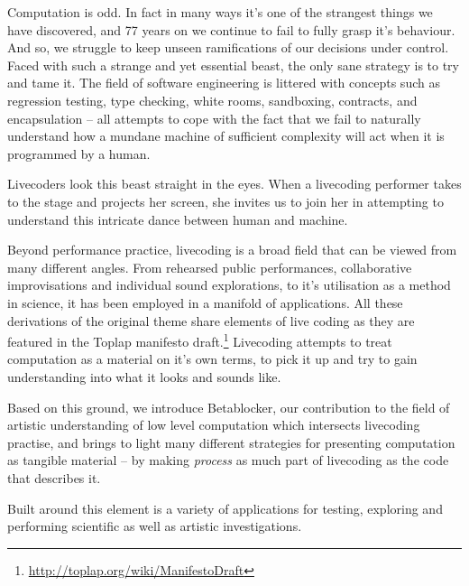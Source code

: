 \documentclass[letterpaper, 12pt]{article}
\begin{document}

Computation is odd. 
In fact in many ways it's one of the strangest things we have discovered, and 77 years on we continue to fail to fully grasp it's behaviour.
And so, we struggle to keep unseen ramifications of our decisions under control. Faced with such a strange and yet essential beast, the only sane strategy is to try and tame it. 
The field of software engineering is littered with concepts such as regression testing, type checking, white rooms, sandboxing, contracts, and encapsulation -- all attempts to cope with the fact that we fail to naturally understand how a mundane machine of sufficient complexity will act when it is programmed by a human.

Livecoders look this beast straight in the eyes. 
When a livecoding performer takes to the stage and projects her screen, she invites us to join her in attempting to understand this intricate dance between human and machine. 

Beyond performance practice, livecoding is a broad field that can be viewed from many different angles.
From rehearsed public performances, collaborative improvisations and individual sound explorations, to it's utilisation as a method in science, it has been employed in a manifold of applications.
All these derivations of the original theme share elements of live coding as they are featured in the Toplap manifesto draft.\footnote{\url{http://toplap.org/wiki/ManifestoDraft}} \citep{ward2004-liv}
Livecoding attempts to treat computation as a material on it's own terms, to pick it up and try to gain understanding into what it looks\citep{mclean2010-vis} and sounds like.

Based on this ground, we introduce Betablocker, our contribution to the field of artistic understanding of low level computation\citep{2006-the} %
 which intersects livecoding practise, and brings to light many different strategies for presenting computation as tangible material -- by making \emph{process} as much part of livecoding as the code that describes it.

Built around this element is a variety of applications for testing, exploring and performing scientific as well as artistic investigations.

\end{document}
